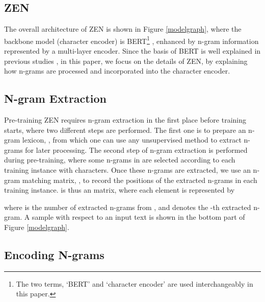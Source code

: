 \documentclass[11pt,a4paper]{article}
\begin{document}
\begin{CJK}{UTF8}{gbsn}
\section{ZEN}
The overall architecture of ZEN is shown in Figure \ref{modelgraph}, where
the backbone model (character encoder) is BERT\footnote{The two terms, `BERT' and `character encoder' are used interchangeably in this paper.} \cite{devlin2018bert}, enhanced by n-gram information represented by a multi-layer encoder.
Since the basis of BERT is well explained in previous studies \citep{devlin2018bert,yu2019adapting},
in this paper, we focus on the details of ZEN, by explaining how n-grams are processed and incorporated into the character encoder.





\subsection{N-gram Extraction}

Pre-training ZEN requires n-gram extraction in the first place before training starts,
where two different steps are performed.
The first one is to prepare an n-gram lexicon, , 
from which one can use any unsupervised method to extract n-grams for later processing.
The second step of n-gram extraction is performed during pre-training, where some n-grams in  are selected according to each training instance  with  characters.
Once these n-grams are extracted, we use an n-gram matching matrix, , to record the positions of the extracted n-grams in each training instance.
 is thus an  matrix, where each element is represented by

where  is the number of extracted n-grams from , and   denotes the -th extracted n-gram.
A sample  with respect to an input text is shown in the bottom part of Figure \ref{modelgraph}.





\subsection{Encoding N-grams}


\end{CJK}
\end{document}
